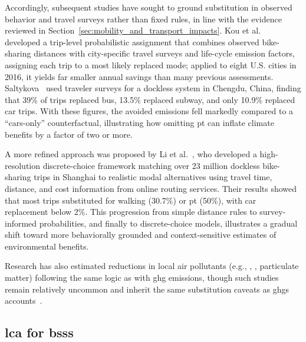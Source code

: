     Accordingly, subsequent studies have sought to ground substitution in observed behavior and travel surveys rather than fixed rules, in line with the evidence reviewed in Section~\ref{sec:mobility_and_transport_impacts}. Kou et al.~\cite{Kou2020} developed a trip-level probabilistic assignment that combines observed bike-sharing distances with city-specific travel surveys and life-cycle emission factors, assigning each trip to a most likely replaced mode; applied to eight U.S. cities in 2016, it yields far smaller annual savings than many previous assessments. Saltykova~\cite{Saltykova2022} used traveler surveys for a dockless system in Chengdu, China, finding that 39\% of trips replaced bus, 13.5\% replaced subway, and only 10.9\% replaced car trips. With these figures, the avoided emissions fell markedly compared to a ``cars-only'' counterfactual, illustrating how omitting \ac{pt} can inflate climate benefits by a factor of two or more. 
    
    A more refined approach was proposed by Li et al.~\cite{Liu2021}, who developed a high-resolution discrete-choice framework matching over 23 million dockless bike-sharing trips in Shanghai to realistic modal alternatives using travel time, distance, and cost information from online routing services. Their results showed that most trips substituted for walking (30.7\%) or \ac{pt} (50\%), with car replacement below 2\%. This progression from simple distance rules to survey-informed probabilities, and finally to discrete-choice models, illustrates a gradual shift toward more behaviorally grounded and context-sensitive estimates of environmental benefits.
    
    Research has also estimated reductions in local air pollutants (e.g., , , particulate matter) following the same logic as with \ac{ghg} emissions, though such studies remain relatively uncommon and inherit the same substitution caveats as \acp{ghg} accounts~\cite{Zhang2018, Qiu2018}.



    \subsection[LCA for BSSs]{\ac{lca} for \acp{bss}}


